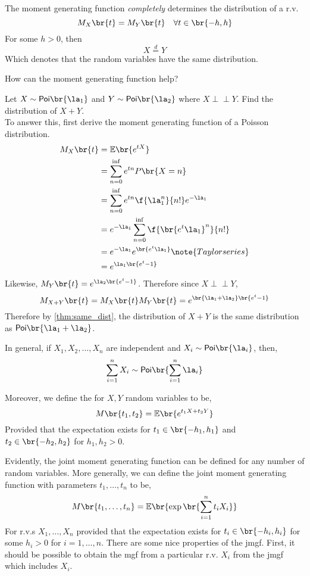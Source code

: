 \documentclass{article}
\newcommand{\indep}{\!\!\perp\!\!\!\!\perp\!\!}
\newcommand{\Exp}{\mathbb{E}}
\newcommand{\Poi}{\mathsf{Poi}}
\newcommand{\Mom}{M}
\begin{document}
\begin{theorem}
    \label{thm:same_dist}
    The moment generating function \textit{completely} determines the distribution of a r.v.
    \[ M_X\br{t} = M_Y\br{t} \quad \forall t \in \br{-h, h} \]
    For some $h > 0$, then
    \[ X \stackrel{d}{=} Y \]
    Which denotes that the random variables have the same distribution.
\end{theorem}

How can the moment generating function help?

\begin{example}
    Let $X \sim \Poi\br{\la_1}$ and $Y \sim \Poi\br{\la_2}$ where $X \indep Y$. Find the distribution of $X+Y$.\\
    To answer this, first derive the moment generating function of a Poisson distribution.
    \begin{align*}
        M_X\br{t} &= \Exp\br{e^{tX}} \\
        &= \sum_{n=0}^{\inf} e^{tn} P\br{X = n} \\
        &= \sum_{n=0}^{\inf} e^{tn} \f{\la_1^n}{n!} e^{- \la_1} \\
        &= e^{- \la_1}\sum_{n=0}^{\inf} \f{\br{e^{t}\la_1}^n}{n!}  \\
        &= e^{- \la_1}e^{\br{e^{t}\la_1}} \note{Taylor series}  \\
        &= e^{\la_1\br{e^{t}- 1}}  \\
    \end{align*}
    Likewise, $M_Y\br{t} = e^{\la_2\br{e^{t} - 1}}$. Therefore since $X \indep Y$,
    \[ M_{X+Y}\br{t} = M_X\br{t}M_Y\br{t} = e^{\br{\la_1 + \la_2}\br{e^{t} - 1}} \]
    Therefore by \cref{thm:same_dist}, the distribution of $X+Y$ is the same distribution as $\Poi\br{\la_1 + \la_2}$.
\end{example}

In general, if $X_1, X_2, \ldots, X_n$ are independent and $X_i \sim \Poi\br{\la_i}$, then,
\[ \sum_{i=1}^{n} X_i \sim \Poi\br{\sum_{i=1}^{n} \la_i} \]

\begin{definition}
    Moreover, we define the  for $X, Y$ random variables to be,
    \[ \Mom\br{t_1, t_2} = \Exp\br{e^{t_1 X + t_2 Y}} \]
    Provided that the expectation exists for $t_1 \in \br{-h_1, h_1}$ and $t_2 \in \br{-h_2, h_2}$ for $h_1, h_2 > 0$.
\end{definition}
Evidently, the joint moment generating function can be defined for any number of random variables. More generally, we can define the joint moment generating function with parameters $t_1, \ldots, t_n$ to be,
\[ \Mom\br{t_1, \ldots, t_n} = \Exp\br{\exp\br{\sum_{i=1}^{n} t_i X_i}} \]
For r.v.s $X_1, \ldots, X_n$ provided that the expectation exists for $t_i \in \br{-h_i, h_i}$ for some $h_i > 0$ for $i = 1, \ldots, n$. There are some nice properties of the jmgf. First, it should be possible to obtain the mgf from a particular r.v. $X_i$ from the jmgf which includes $X_i$.\\
\end{document}
